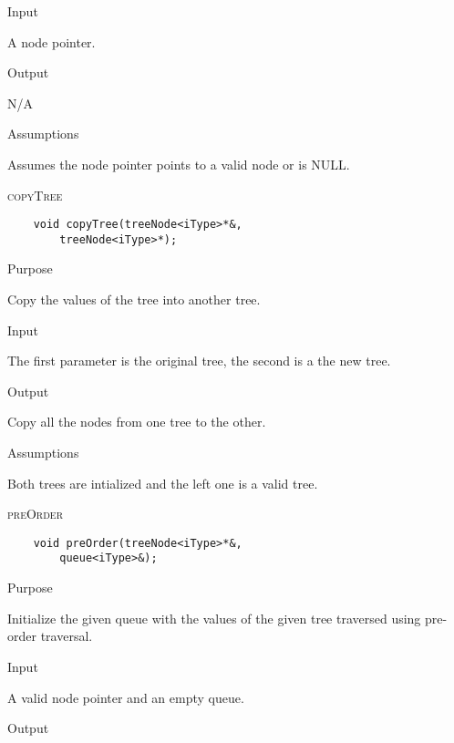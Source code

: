 \documentclass[pdftex, 12pt]{article}
\begin{document}
\begin{description}
\begin{description}
			\item{Input}

				A node pointer.

			\item{Output}

				N/A

			\item{Assumptions}

				Assumes the node pointer points to a valid node or is NULL.

		\end{description}
	\item{\textsc{copyTree}}
\begin{lstlisting}
	void copyTree(treeNode<iType>*&,
		treeNode<iType>*);
\end{lstlisting}
		\begin{description}

			\item{Purpose}

				Copy the values of the tree into another tree.

			\item{Input}

				The first parameter is the original tree, the second is a the new tree.

			\item{Output}

				Copy all the nodes from one tree to the other.

			\item{Assumptions}

				Both trees are intialized and the left one is a valid tree.

		\end{description}
	\item{\textsc{preOrder}}
\begin{lstlisting}
	void preOrder(treeNode<iType>*&,
		queue<iType>&);
\end{lstlisting}
		\begin{description}

			\item{Purpose}
				
				Initialize the given queue with the values of the given tree traversed using pre-order traversal.

			\item{Input}

				A valid node pointer and an empty queue.

			\item{Output}


\end{description}
\end{description}
\end{document}
